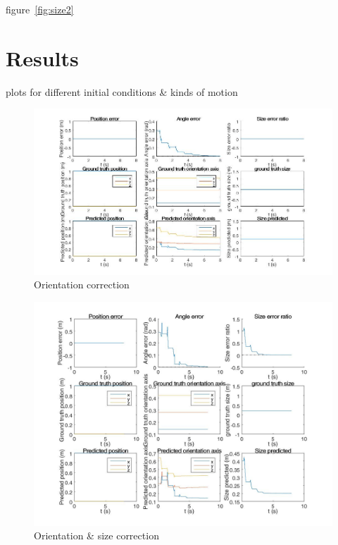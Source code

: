 			figure~\ref{fig:size2}
			
			
\section{Results}
plots for different initial conditions \& kinds of motion

\begin{figure}
  \includegraphics[width=1.2\textwidth,trim = 0mm 0mm 0mm 0mm,clip]{./Figures/observer_error_stationary_orientation.jpg}
  \caption{Orientation correction}
\end{figure}

\begin{figure}
  \includegraphics[width=1.2\textwidth,trim = 0mm 0mm 0mm 0mm,clip]{./Figures/observer_error_stationary_orientation_size.jpg}
  \caption{Orientation \& size correction}
\end{figure}

